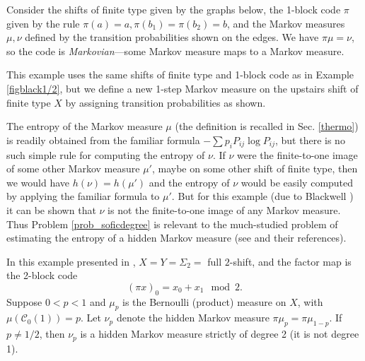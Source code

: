 \documentclass{kepart2010}
\theoremstyle{plain}
\theoremstyle{definition}
\theoremstyle{remark}
\theoremstyle{definition}
\numberwithin{equation}{section}
\begin{document}
\begin{ex}\label{figblack1/2}
Consider the shifts of finite type given by the graphs below, the
1-block code $\pi$ given by the rule $\pi(a)=a,
\pi(b_1)=\pi(b_2)=b$, and the Markov measures $\mu, \nu$ defined by
the transition probabilities shown on the edges. We have $\pi\mu =
\nu$, so the code is {\em Markovian}---some Markov measure maps to a
Markov measure.
\begin{center}
\end{center}
\end{ex}

\begin{ex}\label{figblack1/3}
This example uses the same shifts of finite type and 1-block code as
in Example \ref{figblack1/2},
 but we define a new 1-step Markov measure on the
upstairs shift of finite type $X$ by assigning transition
probabilities as shown.

\begin{center}
\end{center}
The entropy of the Markov measure $\mu$
(the definition is recalled in Sec. \ref{thermo})
 is readily obtained from the
familiar formula $-\sum p_i P_{ij}\log P_{ij}$, but
there is no such simple rule for computing the entropy of $\nu$.
 If $\nu$ were the finite-to-one image of some other
Markov measure $\mu'$, maybe on some other shift of finite type,
then we would have $h(\nu ) = h( \mu ') $ and the entropy of $\nu$
would be easily computed by applying the familiar formula to $\mu'$.
But for  this example (due to Blackwell \cite{Blackwell1957}) it can
be shown \cite{MarcusPetersenWilliams1984} that $\nu$ is not the
finite-to-one image of any Markov measure. Thus Problem
\ref{prob_soficdegree} is relevant to the much-studied problem of
estimating the entropy of a hidden Markov measure (see
\cite{HanMarcus2006,HanMarcus2007} and their references).
\end{ex}
\begin{ex}\label{ex_Walters}
In this example presented in \cite{Walters1986}, $X=Y=\Sigma_2=$
full $2$-shift, and the factor map is the 2-block code
 \begin{equation} (\pi x)_0=x_0+x_1 \mod 2 .
 \end{equation}
Suppose $0<p<1$ and $\mu_p$ is the Bernoulli (product) measure on
$X$,
with $\mu (\mathcal C_0(1))=p$.
Let $\nu_p$ denote the hidden Markov measure
$\pi \mu_p=\pi \mu_{1-p}$.
If $p\neq 1/2$, then $\nu_p$ is
a hidden Markov measure strictly of degree 2 (it is not degree 1).

\end{ex}
\end{document}
